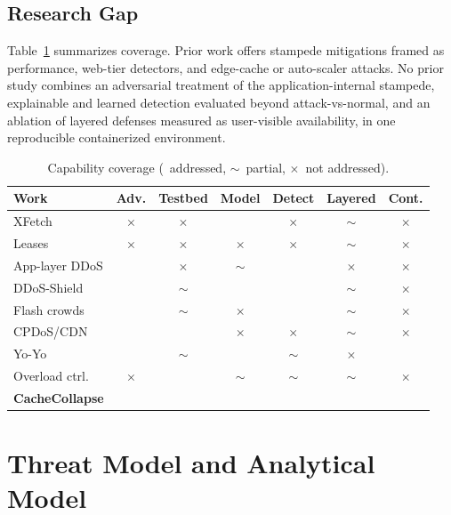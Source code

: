 \documentclass[journal]{IEEEtran}
\newcommand{\yes}{\checkmark}
\newcommand{\no}{$\times$}
\newcommand{\prt}{$\sim$}
\begin{document}
\subsection{Research Gap}
Table~\ref{tab:capability} summarizes coverage. Prior work offers stampede mitigations
framed as performance, web-tier detectors, and edge-cache or auto-scaler attacks. No
prior study combines an adversarial treatment of the application-internal stampede,
explainable and learned detection evaluated beyond attack-vs-normal, and an ablation of
layered defenses measured as user-visible availability, in one reproducible
containerized environment.

\begin{table}[t]
\centering
\caption{Capability coverage (\yes~addressed, \prt~partial, \no~not addressed).}
\label{tab:capability}
\footnotesize
\setlength{\tabcolsep}{3pt}
\begin{tabular}{@{}lcccccc@{}}
\toprule
Work & Adv. & Testbed & Model & Detect & Layered & Cont. \\
\midrule
XFetch \cite{vattani2015} & \no & \no & \yes & \no & \prt & \no \\
Leases \cite{nishtala2013} & \no & \no & \no & \no & \prt & \no \\
App-layer DDoS \cite{xie2009,praseed2019} & \yes & \no & \prt & \yes & \no & \no \\
DDoS-Shield \cite{ranjan2009} & \yes & \prt & \yes & \yes & \prt & \no \\
Flash crowds \cite{jung2002,kandula2005} & \yes & \prt & \no & \yes & \prt & \no \\
CPDoS/CDN \cite{nguyen2019,guo2020} & \yes & \yes & \no & \no & \prt & \no \\
Yo-Yo \cite{sides2016,bremlerbarr2017} & \yes & \prt & \yes & \prt & \no & \yes \\
Overload ctrl.\ \cite{welsh2001} & \no & \yes & \prt & \prt & \prt & \no \\
\textbf{CacheCollapse} & \yes & \yes & \yes & \yes & \yes & \yes \\
\bottomrule
\end{tabular}
\end{table}

\section{Threat Model and Analytical Model}
\label{sec:threat}
\end{document}
